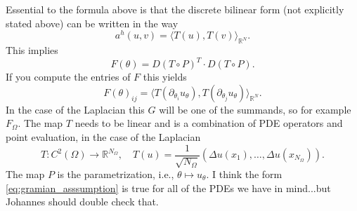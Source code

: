 Essential to the formula above is that the discrete bilinear form (not explicitly stated above) can be written in the way
\begin{equation}\label{eq:gramian_asssumption}
  a^h(u,v)
  =
  \langle T(u), T(v) \rangle_{\mathbb R^N}.
\end{equation}
This implies
\begin{equation*}
  F(\theta) = D(T\circ P)^T \cdot D(T \circ P).
\end{equation*}
If you compute the entries of $F$ this yields
\begin{equation*}
  F(\theta)_{ij} = \langle T(\partial_{\theta_i}u_\theta), T(\partial_{\theta_j}u_\theta) \rangle_{\mathbb R^N}.
\end{equation*}
In the case of the Laplacian this $G$ will be one of the summands, so for example $F_\Omega$.
The map $T$ needs to be linear and is a combination of PDE operators and point evaluation, in the case of the Laplacian
\begin{equation*}
  T:C^2(\Omega) \to \mathbb R^{N_\Omega}, \quad T(u) = \frac{1}{\sqrt{N_{\Omega}}}(\Delta u(x_1), \dots, \Delta u(x_{N_{\Omega}})).
\end{equation*}
The map $P$ is the parametrization, i.e., $\theta\mapsto u_\theta$.
I think the form \eqref{eq:gramian_asssumption} is true for all of the PDEs we have in mind...but Johannes should double check that.

